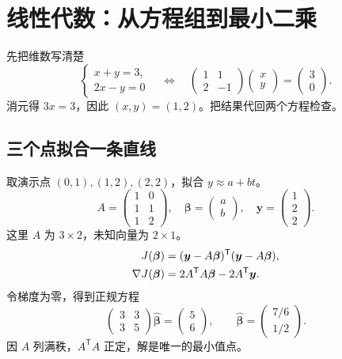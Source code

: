 \documentclass[UTF8,11pt,a4paper,oneside,openany,linespread=1]{ctexbook}
\numberwithin{equation}{chapter}
\begin{document}
\section{线性代数：从方程组到最小二乘}\label{ch:linear}
\begin{conceptbox}{先把维数写清楚}
\[
  \begin{cases}x+y=3,\\2x-y=0\end{cases}
  \quad\Longleftrightarrow\quad
  \begin{pmatrix}1&1\\2&-1\end{pmatrix}
  \begin{pmatrix}x\\y\end{pmatrix}
  =\begin{pmatrix}3\\0\end{pmatrix}.
\]
消元得 \(3x=3\)，因此 \((x,y)=(1,2)\)。把结果代回两个方程检查。
\end{conceptbox}

\subsection{三个点拟合一条直线}
取演示点 \((0,1),(1,2),(2,2)\)，拟合 \(y\approx a+bt\)。
\[
  A=\begin{pmatrix}1&0\\1&1\\1&2\end{pmatrix},\quad
  \bm{\beta}=\begin{pmatrix}a\\b\end{pmatrix},\quad
  \bm{y}=\begin{pmatrix}1\\2\\2\end{pmatrix}.
\]
这里 \(A\) 为 \(3\times2\)，未知向量为 \(2\times1\)。
\begin{align}
  J(\bm{\beta})
    &=(\bm{y}-A\bm{\beta})^{\mathsf T}(\bm{y}-A\bm{\beta}),\notag\\
  \nabla J(\bm{\beta})
    &=2A^{\mathsf T}A\bm{\beta}-2A^{\mathsf T}\bm{y}.\label{eq:gradient}
\end{align}
令梯度为零，得到正规方程
\[
  \begin{pmatrix}3&3\\3&5\end{pmatrix}\widehat{\bm{\beta}}
  =\begin{pmatrix}5\\6\end{pmatrix},\qquad
  \widehat{\bm{\beta}}=\begin{pmatrix}7/6\\1/2\end{pmatrix}.
\]
因 \(A\) 列满秩，\(A^{\mathsf T}A\) 正定，解是唯一的最小值点。
\end{document}
